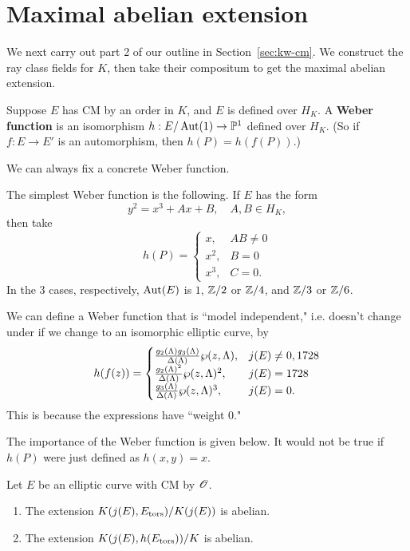 \section{Maximal abelian extension}
We next carry out part 2 of our outline in Section~\ref{sec:kw-cm}. We construct the ray class fields for $K$, then take their compositum to get the maximal abelian extension.
\begin{df}
Suppose $E$ has CM by an order in $K$, and $E$ is defined over $H_K$.
A \textbf{Weber function} is an isomorphism $h:E/\operatorname{Aut}(1)\to \mathbb{P}^1$ defined over $H_K$. (So if $f:E\to E'$ is an automorphism, then $h(P)=h(f(P))$.)
\end{df}
We can always fix a concrete Weber function.
\begin{ex}
The simplest Weber function is the following. If $E$ has the form
\[
y^2=x^3+Ax+B,\quad A,B\in H_K,
\]
then take \[h(P)=\begin{cases}
x,&AB\ne 0\\
x^2,&B=0\\
x^3,&C=0.
\end{cases}
\]
In the 3 cases, respectively, $\operatorname{Aut}(E)$ is $1$, $\mathbb{Z}/2$ or $\mathbb{Z}/4$, and $\mathbb{Z}/3$ or $\mathbb{Z}/6$. %

We can define a Weber function that is ``model independent," i.e. doesn't change under if we change to an isomorphic elliptic curve, by
\[
h(f(z))=\begin{cases}
\frac{g_2(\Lambda)g_3(\Lambda)}{\Delta(\Lambda)}\wp(z,\Lambda),&j(E)\ne 0,1728\\
\frac{g_2(\Lambda)^2}{\Delta(\Lambda)}\wp(z,\Lambda)^2,&j(E)=1728\\
\frac{g_3(\Lambda)}{\Delta(\Lambda)}\wp(z,\Lambda)^3,&j(E)=0.
\end{cases}
\]
This is because the expressions have ``weight 0."
\end{ex}
The importance of the Weber function is given below. It would not be true if $h(P)$ were just defined as $h(x,y)=x$.
\begin{lem}
Let $E$ be an elliptic curve with CM by $\mathscr{O}$. 
\begin{enumerate}
\item
The extension $K(j(E),E_{\text{tors}})/K(j(E))$ is abelian.
\item
The extension $K(j(E),h(E_{\text{tors}}))/K$ is abelian.
\end{enumerate}
\end{lem}
